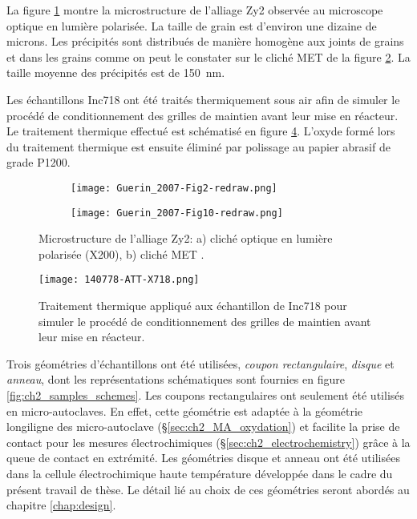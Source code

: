 \begin{refsection}
    La figure \ref{subfig:ch2_Zy2_microstructure_optical} montre la microstructure de l'alliage Zy2 observée au
    microscope optique en lumière polarisée. La taille de grain est d'environ une dizaine de microns. Les précipités
    sont distribués de manière homogène aux joints de grains et dans les grains comme on peut le constater sur le cliché MET de la
    figure \ref{subfig:ch2_Zy2_SPPs_MET}. La taille moyenne des précipités est de \SI{150}{\nano\meter}.

     Les échantillons Inc718 ont été traités thermiquement sous air afin de simuler le procédé de conditionnement des
    grilles de maintien avant leur mise en réacteur. Le traitement thermique effectué est schématisé en figure
    \ref{fig:ch2_thermal_treat}.
    L'oxyde formé lors du traitement thermique est ensuite éliminé par polissage au papier
    abrasif de grade P1200.

    \begin{figure}[H]
    \centering
        \begin{subfigure}[b]{0.5\textwidth}
            \texttt{[image: Guerin\_2007-Fig2-redraw.png]} 
			\caption{}
			\label{subfig:ch2_Zy2_microstructure_optical}
        \end{subfigure}
        \quad
        \begin{subfigure}[b]{0.4\textwidth}
            \texttt{[image: Guerin\_2007-Fig10-redraw.png]} 
			\caption{}
			\label{subfig:ch2_Zy2_SPPs_MET}
        \end{subfigure}
    \caption[Microstructure de l'alliage Zy2]
    {Microstructure de l'alliage Zy2: 
            a) cliché optique en lumière polarisée (X200),
            b) cliché MET \citep{Guerin2007}.}
    \label{fig:ch2_microstructure}
    \end{figure}    

    \begin{figure}[H]
        \centering
            \texttt{[image: 140778-ATT-X718.png]}
        \caption{Traitement thermique appliqué aux échantillon de Inc718 pour simuler le procédé de conditionnement
        des grilles de maintien avant leur mise en réacteur.}
        \label{fig:ch2_thermal_treat}
    \end{figure}

    Trois géométries d'échantillons ont été utilisées, \emph{coupon rectangulaire}, \emph{disque} et \emph{anneau}, 
    dont les représentations schématiques sont
    fournies en figure \ref{fig:ch2_samples_schemes}. Les coupons rectangulaires ont
    seulement été utilisés en micro-autoclaves. En effet, cette géométrie est adaptée à la géométrie longiligne des
    micro-autoclave (\S\ref{sec:ch2_MA_oxydation}) et facilite la prise de contact pour les mesures
    électrochimiques (\S\ref{sec:ch2_electrochemistry}) grâce à la queue de contact en extrémité. 
    Les géométries disque et anneau ont été utilisées dans la cellule électrochimique haute température développée dans le cadre du présent travail
    de thèse. Le détail lié au choix de ces géométries seront abordés au chapitre \ref{chap:design}.


\end{refsection}
